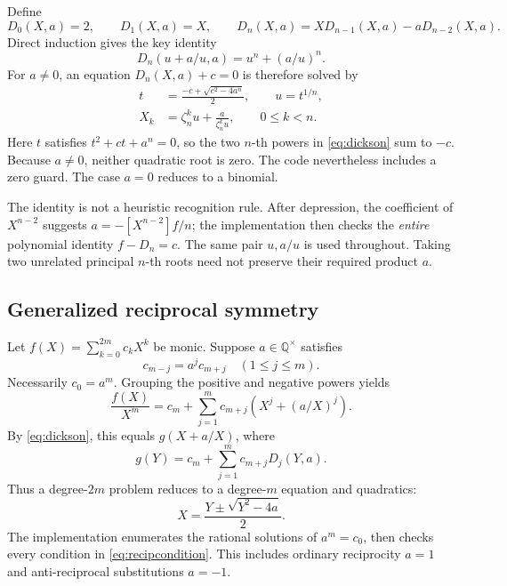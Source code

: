 \documentclass[11pt,letterpaper]{article}
\newcommand{\Q}{\mathbb Q}\newcommand{\C}{\mathbb C}
\theoremstyle{definition}\newtheorem{definition}[theorem]{Definition}
\theoremstyle{remark}\newtheorem{remark}[theorem]{Remark}
\begin{document}
Define
\[
 D_0(X,a)=2,\qquad D_1(X,a)=X,\qquad
 D_n(X,a)=X D_{n-1}(X,a)-aD_{n-2}(X,a).
\]
Direct induction gives the key identity
\begin{equation}
       D_n(u+a/u,a)=u^n+(a/u)^n.                 \label{eq:dickson}
\end{equation}
For \(a\ne0\), an equation \(D_n(X,a)+c=0\) is therefore solved by
\begin{equation}
 \begin{split}
 t&=\frac{-c+\sqrt{c^2-4a^n}}2,\qquad u=t^{1/n},\\
 X_k&=\zeta_n^k u+\frac{a}{\zeta_n^k u},\qquad 0\leq k<n.
 \end{split}                                                 \label{eq:dicksonroots}
\end{equation}
Here \(t\) satisfies \(t^2+ct+a^n=0\), so the two \(n\)-th powers in
\eqref{eq:dickson} sum to \(-c\). Because \(a\ne0\), neither quadratic root
is zero. The code nevertheless includes a zero guard. The case \(a=0\)
reduces to a binomial.

The identity is not a heuristic recognition rule. After depression, the
coefficient of \(X^{n-2}\) suggests
\(a=-[X^{n-2}]f/n\); the implementation then checks the \emph{entire}
polynomial identity \(f-D_n=c\). The same pair \(u,a/u\) is used throughout.
Taking two unrelated principal \(n\)-th roots need not preserve their
required product \(a\).

\subsection{Generalized reciprocal symmetry}

Let \(f(X)=\sum_{k=0}^{2m}c_kX^k\) be monic. Suppose \(a\in\Q^\times\)
satisfies
\begin{equation}
 c_{m-j}=a^j c_{m+j}\quad(1\leq j\leq m).       \label{eq:recipcondition}
\end{equation}
Necessarily \(c_0=a^m\). Grouping the positive and negative powers yields
\[
 \frac{f(X)}{X^m}=c_m+\sum_{j=1}^m c_{m+j}
                     \left(X^j+(a/X)^j\right).
\]
By \eqref{eq:dickson}, this equals \(g(X+a/X)\), where
\[
              g(Y)=c_m+\sum_{j=1}^m c_{m+j}D_j(Y,a).
\]
Thus a degree-\(2m\) problem reduces to a degree-\(m\) equation and quadratics:
\begin{equation}
              X=\frac{Y\pm\sqrt{Y^2-4a}}2.                   \label{eq:inverse-recip}
\end{equation}
The implementation enumerates the rational solutions of \(a^m=c_0\), then
checks every condition in \eqref{eq:recipcondition}. This includes ordinary
reciprocity \(a=1\) and anti-reciprocal substitutions \(a=-1\).
\end{document}
